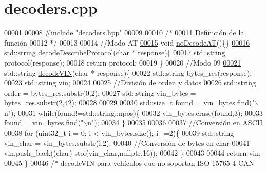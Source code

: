 \hypertarget{decoders_8cpp_source}{}\section{decoders.\+cpp}
\label{decoders_8cpp_source}

\begin{DoxyCode}
00001 
00008 \textcolor{preprocessor}{#include "\hyperlink{decoders_8hpp}{decoders.hpp}"}
00009 
00010 \textcolor{comment}{/*}
00011 \textcolor{comment}{Definición de la función}
00012 \textcolor{comment}{*/}
00013 
00014 \textcolor{comment}{//Modo AT}
\hyperlink{decoders_8hpp_a8ee851a37675f190ea728d6b2f0cdc92}{00015} \textcolor{keywordtype}{void} \hyperlink{decoders_8cpp_a8ee851a37675f190ea728d6b2f0cdc92}{noDecodeAT}()\{\}
\hyperlink{decoders_8hpp_ab83ce79cd098ea655f3812488e304a0c}{00016} std::string \hyperlink{decoders_8cpp_ab83ce79cd098ea655f3812488e304a0c}{decodeDescribeProtocol}(\textcolor{keywordtype}{char} * response)\{
00017     std::string protocol(response);
00018     \textcolor{keywordflow}{return} protocol;
00019 \}
00020 \textcolor{comment}{//Modo 09}
\hyperlink{decoders_8hpp_a66754738119854c13a74265e209083e4}{00021} std::string \hyperlink{decoders_8cpp_a66754738119854c13a74265e209083e4}{decodeVIN}(\textcolor{keywordtype}{char} * response)\{
00022     std::string bytes\_res(response);
00023     std::string vin;
00024 
00025     \textcolor{comment}{//División de orden y datos}
00026     std::string order = bytes\_res.substr(0,2);
00027     std::string vin\_bytes = bytes\_res.substr(2,42);
00028 
00029 
00030     std::size\_t found = vin\_bytes.find(\textcolor{stringliteral}{"\(\backslash\)n"});
00031     \textcolor{keywordflow}{while}(found!=std::string::npos)\{
00032         vin\_bytes.erase(found,3);
00033         found = vin\_bytes.find(\textcolor{stringliteral}{"\(\backslash\)n"});
00034     \}
00035 
00036 
00037     \textcolor{comment}{//Conversión en ASCII}
00038     \textcolor{keywordflow}{for} (uint32\_t i = 0; i < vin\_bytes.size(); i+=2)\{
00039         std::string vin\_char = vin\_bytes.substr(i,2);
00040         \textcolor{comment}{//Conversión de bytes en char}
00041         vin.push\_back((\textcolor{keywordtype}{char}) stoi(vin\_char,\textcolor{keyword}{nullptr},16));
00042     \}
00043 
00044     \textcolor{keywordflow}{return} vin; 
00045 \}
00046 \textcolor{comment}{/* decodeVIN para vehículos que no soportan ISO 15765-4 CAN}

\end{DoxyCode}
